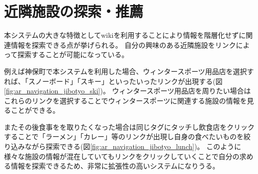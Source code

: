 \section{近隣施設の探索・推薦}
本システムの大きな特徴としてwikiを利用することにより情報を階層化せずに関連情報を探索できる点が挙げられる。
自分の興味のある近隣施設をリンクによって探索することが可能になっている。

例えば神保町で本システムを利用した場合、ウィンタースポーツ用品店を選択すれば、「スノーボード」「スキー」といったいったリンクが出現する(図\ref{fig:ar_navigation_jibotyo_ski})。
ウィンタースポーツ用品店を周りたい場合はこれらのリンクを選択することでウィンタースポーツに関連する施設の情報を見ることができる。

またその後食事をを取りたくなった場合は同じタグにタッチし飲食店をクリックすることで「ラーメン」「カレー」等のリンクが出現し自身の食べたいものを絞り込みながら探索できる(図\ref{fig:ar_navigation_jibotyo_lunch})。
このように様々な施設の情報が混在していてもリンクをクリックしていくことで自分の求める情報を探索できるため、非常に拡張性の高いシステムになりうる。

